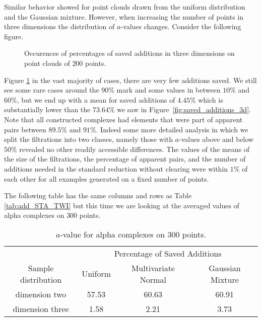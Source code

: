 Similar behavior showed for point clouds drawn from the uniform distribution and the Gaussian mixture. However, when increasing the number of points in three dimensions the distribution of $a$-values changes. Consider the following figure.

\begin{figure}[H]
\begin{subfigure}[c]{0.95\textwidth}
\begin{center}

\end{center}
\end{subfigure}
\caption{Occurences of percentages of saved additions in three dimensions on point clouds of $200$ points.}
\label{fig:saved_additions_3d_large_complex}
\end{figure}

Figure \ref{fig:saved_additions_3d_large_complex} in the vast majority of cases, there are very few additions saved. We still see some rare cases around the $90\%$ mark and some values in between $10\%$ and $60\%$, but we end up with a mean for saved additions of $4.45\%$ which is substantially lower than the $73.64\%$ we saw in Figure~\ref{fig:saved_additions_3d}. Note that all constructed complexes had elements that were part of apparent pairs between $89.5\%$ and $91\%$. Indeed some more detailed analysis in which we split the filtrations into two classes, namely those with $a$-values above and below $50\%$ revealed no other readily accessible differences. The values of the means of the size of the filtrations, the percentage of apparent pairs, and the number of additions needed in the standard reduction without clearing were within $1\%$ of each other for all examples generated on a fixed number of points. 

The following table has the same columns and rows as Table \ref{tab:add_STA_TWI} but this time we are looking at the averaged values of alpha complexes on $300$ points.

 \begin{table}[H]
     \begin{center}
     \begin{tabular}{|c|c|c|c|}
     \hline
     & \multicolumn{3}{|c|}{Percentage of Saved Additions} \\ \cline{1-4}
     Sample distribution & Uniform & Multivariate Normal & Gaussian 		Mixture\\ \hline
     dimension two & 57.53 & 60.63 & 60.91 \\ \hline
     dimension three & 1.58 & 2.21 & 3.73 \\ \hline

     \end{tabular}
     
     \caption{$a$-value for alpha complexes on $300$ points.}
     \label{tab:add_STA_TWI_300}
     \end{center}
 \end{table}
 
